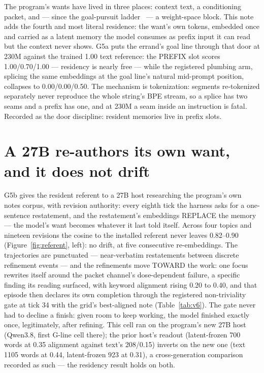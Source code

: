 \documentclass[11pt]{article}
\begin{document}
The program's wants have lived in three places: context text, a
conditioning packet, and --- since the goal-pursuit
ladder~\cite{penov2026hostblock} --- a weight-space block. This note
adds the fourth and most literal residence: the want's own tokens,
embedded once and carried as a latent memory the model consumes as
prefix input it can read but the context never shows. G5a puts the
errand's goal line through that door at 230M against the trained
1.00 text reference: the PREFIX slot scores 1.00/0.70/1.00 --- residency is
nearly free --- while the registered plumbing arm, splicing the same
embeddings at the goal line's natural mid-prompt position, collapses
to 0.00/0.00/0.50. The mechanism is tokenization: segments re-tokenized
separately never reproduce the whole string's BPE stream, so a splice
has two seams and a prefix has one, and at 230M a seam inside an
instruction is fatal. Recorded as the door discipline: resident
memories live in prefix slots.

\section{A 27B re-authors its own want, and it does not drift}

G5b gives the resident referent to a 27B host researching the
program's own notes corpus, with revision authority: every eighth
tick the harness asks for a one-sentence restatement, and the
restatement's embeddings REPLACE the memory --- the model's want
becomes whatever it last told itself. Across four topics and nineteen
revisions the cosine to the installed referent never leaves
0.82--0.90 (Figure~\ref{fig:referent}, left): no drift, at five
consecutive re-embeddings. The trajectories are punctuated ---
near-verbatim restatements between discrete refinement events --- and
the refinements move TOWARD the work: one focus rewrites itself around
the packet channel's dose-dependent failure, a specific finding its
reading surfaced, with keyword alignment rising 0.20 to 0.40, and that
episode then declares its own completion through the registered
non-triviality gate at tick 34 with the grid's best-aligned note
(Table~\ref{tab:v6}). The gate never had to decline a finish: given
room to keep working, the model finished exactly once, legitimately,
after refining. This cell ran on the program's new 27B host
(Qwen3.8, first G-line cell there); the prior host's readout
(latent-frozen 700 words at
0.35 alignment against text's
208/0.15)
inverts on the new one (text 1105 words at
0.44, latent-frozen
923 at
0.31), a cross-generation
comparison recorded as such --- the residency result holds on both.
\end{document}
